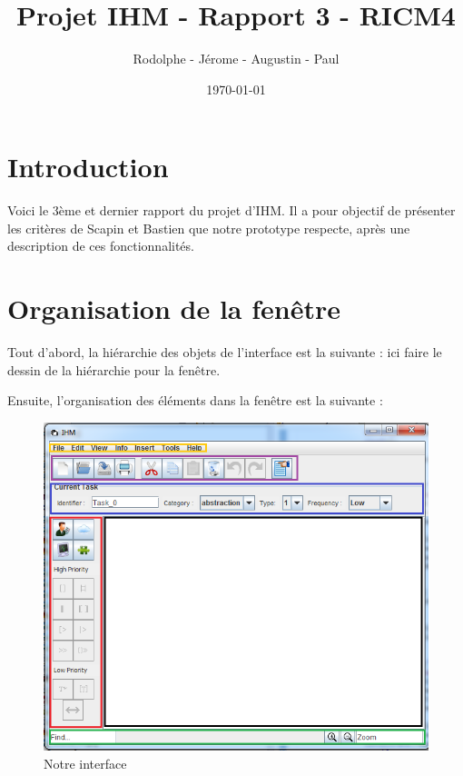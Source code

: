 \documentclass[12pt, a4paper]{article}
\title{Projet IHM - Rapport 3 - RICM4}
\author{\bsc{Fréby} Rodolphe - \bsc{Barbier} Jérome - \bsc{Husson} Augustin - \bsc{Labat} Paul}
\date{\today}
\begin{document}
\maketitle
\tableofcontents
\newpage

\section{Introduction}
Voici le 3ème et dernier rapport du projet d'IHM. Il a pour objectif de présenter les critères de Scapin et Bastien que notre prototype respecte, après une description de ces fonctionnalités.

\section{Organisation de la fenêtre}

Tout d'abord, la hiérarchie des objets de l'interface est la suivante :
ici faire le dessin de la hiérarchie pour la fenêtre.

Ensuite, l'organisation des éléments dans la fenêtre est la suivante :

\begin{figure}[h]
\begin{center}
   \includegraphics[scale = 0.7]{interface.png}
	\caption{Notre interface}
	\end{center}
\end{figure}
\end{document}
